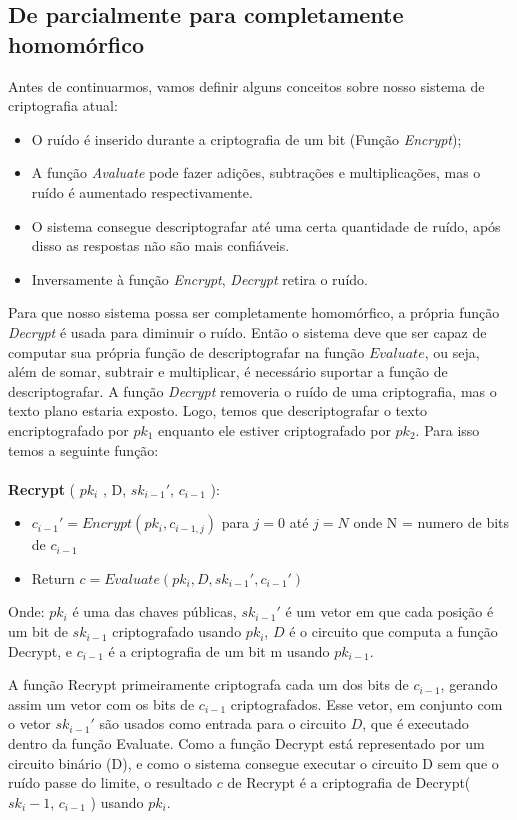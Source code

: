 \subsection{De parcialmente para completamente homomórfico}

Antes de continuarmos, vamos definir alguns conceitos sobre nosso sistema de criptografia atual:
  \begin{itemize}
   \item O ruído é inserido durante a criptografia de um bit (Função \textit{Encrypt});
   \item A função \textit{Avaluate} pode fazer adições, subtrações e multiplicações, mas o ruído é aumentado respectivamente.
   \item O sistema consegue descriptografar até uma certa quantidade de ruído, após disso as respostas não são mais confiáveis.
   \item Inversamente à função \textit{Encrypt}, \textit{Decrypt} retira o ruído.
  \end{itemize}
  
  Para que nosso sistema possa ser completamente homomórfico, a própria função \textit{Decrypt} é usada para diminuir o ruído.
  Então o sistema deve que ser capaz de computar sua própria função de descriptografar na função \(Evaluate\), ou seja, além de somar, subtrair e multiplicar, é necessário suportar a função de descriptografar.
  A função \textit{Decrypt} removeria o ruído de uma criptografia, mas o texto plano estaria exposto. Logo, temos que descriptografar o texto encriptografado por \(pk_1\) enquanto ele estiver criptografado por \(pk_2\). Para isso temos a seguinte função:
  \\\\
  \textbf{Recrypt} ( \(pk_i\) , D, \(sk_{i-1}'\), \(c_{i-1}\) ):
  \begin{itemize}
   \item \( c_{i-1}' = Encrypt(pk_i, c_{i-1,j}) \) para \( j = 0 \) até \( j = N \) onde N = numero de bits de \( c_{i-1} \)
   \item Return \( c = Evaluate(pk_i, D, sk_{i-1}', c_{i-1}') \)
  \end{itemize}
  Onde: \( pk_i \) é uma das chaves públicas, \( sk_{i-1}' \) é um vetor em que cada posição é um bit de \( sk_{i-1} \) criptografado usando \( pk_i \), \( D \) é o circuito que computa a função Decrypt, e \( c_{i-1} \) é a criptografia de um bit m usando \( pk_{i-1} \).
  
  A função Recrypt primeiramente criptografa cada um dos bits de \( c_{i-1} \), gerando assim um vetor com os bits de \( c_{i-1} \) criptografados.
  Esse vetor, em conjunto com o vetor \( sk_{i-1}' \) são usados como entrada para o circuito \( D \), que é executado dentro da função Evaluate.
  Como a função Decrypt está representado por um circuito binário (D), e como o sistema consegue executar o circuito D sem que o ruído passe do limite, o resultado \( c \) de Recrypt é a criptografia de Decrypt( \( sk_i-1 \), \( c_{i-1} \) ) usando \( pk_i \).
  
